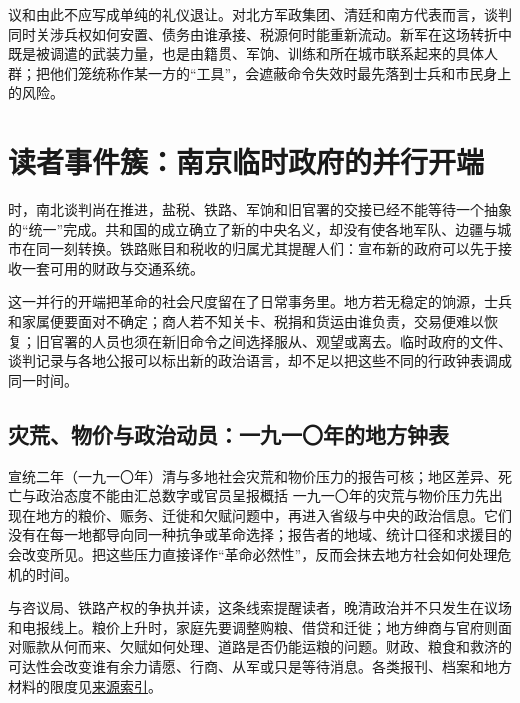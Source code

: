 议和由此不应写成单纯的礼仪退让。对北方军政集团、清廷和南方代表而言，谈判同时关涉兵权如何安置、债务由谁承接、税源何时能重新流动。新军在这场转折中既是被调遣的武装力量，也是由籍贯、军饷、训练和所在城市联系起来的具体人群；把他们笼统称作某一方的“工具”，会遮蔽命令失效时最先落到士兵和市民身上的风险。

\section{读者事件簇：南京临时政府的并行开端}

时，南北谈判尚在推进，盐税、铁路、军饷和旧官署的交接已经不能等待一个抽象的“统一”完成。共和国的成立确立了新的中央名义，却没有使各地军队、边疆与城市在同一刻转换。铁路账目和税收的归属尤其提醒人们：宣布新的政府可以先于接收一套可用的财政与交通系统。

这一并行的开端把革命的社会尺度留在了日常事务里。地方若无稳定的饷源，士兵和家属便要面对不确定；商人若不知关卡、税捐和货运由谁负责，交易便难以恢复；旧官署的人员也须在新旧命令之间选择服从、观望或离去。临时政府的文件、谈判记录与各地公报可以标出新的政治语言，却不足以把这些不同的行政钟表调成同一时间。

\subsection{灾荒、物价与政治动员：一九一〇年的地方钟表}
\begin{event}{}{宣统二年（一九一〇年）}{清与多地社会}{灾荒和物价压力的报告可核；地区差异、死亡与政治态度不能由汇总数字或官员呈报概括}
一九一〇年的灾荒与物价压力先出现在地方的粮价、赈务、迁徙和欠赋问题中，再进入省级与中央的政治信息。它们没有在每一地都导向同一种抗争或革命选择；报告者的地域、统计口径和求援目的会改变所见。把这些压力直接译作“革命必然性”，反而会抹去地方社会如何处理危机的时间。

与咨议局、铁路产权的争执并读，这条线索提醒读者，晚清政治并不只发生在议场和电报线上。粮价上升时，家庭先要调整购粮、借贷和迁徙；地方绅商与官府则面对赈款从何而来、欠赋如何处理、道路是否仍能运粮的问题。财政、粮食和救济的可达性会改变谁有余力请愿、行商、从军或只是等待消息。各类报刊、档案和地方材料的限度见\hyperref[app:sources]{来源索引}。
\end{event}

